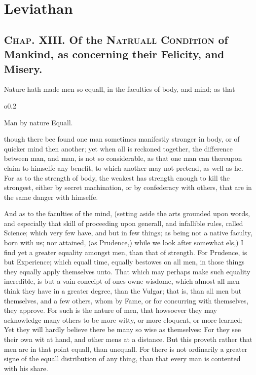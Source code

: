 
\author{Thomas Hobbes}
\chapter[Leviathan, chaps. 13 and 17]{Leviathan}

\section*{\textsc{Chap}. XIII. Of the \textsc{Natruall
Condition} of Mankind, as concerning their Felicity, and Misery.}

Nature hath made men so equall, in the faculties of body, and mind; as
that \begin{wrapfigure}[4]{o}{0.2\textwidth}\raggedright Man by nature
Equall. \end{wrapfigure} though there bee found one man sometimes
manifestly stronger in body, or of quicker mind then another; yet when
all is reckoned together, the difference between man, and man, is not
so considerable, as that one man can thereupon claim to himselfe any
benefit, to which another may not pretend, as well as he. For as to
the strength of body, the weakest has strength enough to kill the
strongest, either by secret machination, or by confederacy with
others, that are in the same danger with himselfe.

And as to the faculties of the mind, (setting aside the arts
grounded upon words, and especially that skill of proceeding upon
generall, and infallible rules, called Science; which very few have,
and but in few things; as being not a native faculty, born with us;
nor attained, (as Prudence,) while we look after somewhat els,) I find
yet a greater equality amongst men, than that of strength. For
Prudence, is but Experience; which equall time, equally bestowes on
all men, in those things they equally apply themselves unto. That
which may perhaps make such equality incredible, is but a vain
conceipt of ones owne wisdome, which almost all men think they have
in a greater degree, than the Vulgar; that is, than all men but
themselves, and a few others, whom by Fame, or for concurring with
themselves, they approve. For such is the nature of men, that
howsoever they may acknowledge many others to be more witty, or more
eloquent, or more learned; Yet they will hardly believe there be many
so wise as themselves: For they see their own wit at hand, and other
mens at a distance. But this proveth rather that men are in that
point equall, than unequall. For there is not ordinarily a greater
signe of the equall distribution of any thing, than that every man is
contented with his share.

